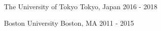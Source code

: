 \vspace*{0.5cm}

\begin{cventries}

    {The University of Tokyo}
    {Tokyo, Japan}
    {2016 - 2018}
    {}
    \vspace*{-0.2cm}

    {Boston University}
    {Boston, MA}
    {2011 - 2015}
    {}
    \vspace*{-0.2cm}

\vspace*{-0.4cm}
\end{cventries}
